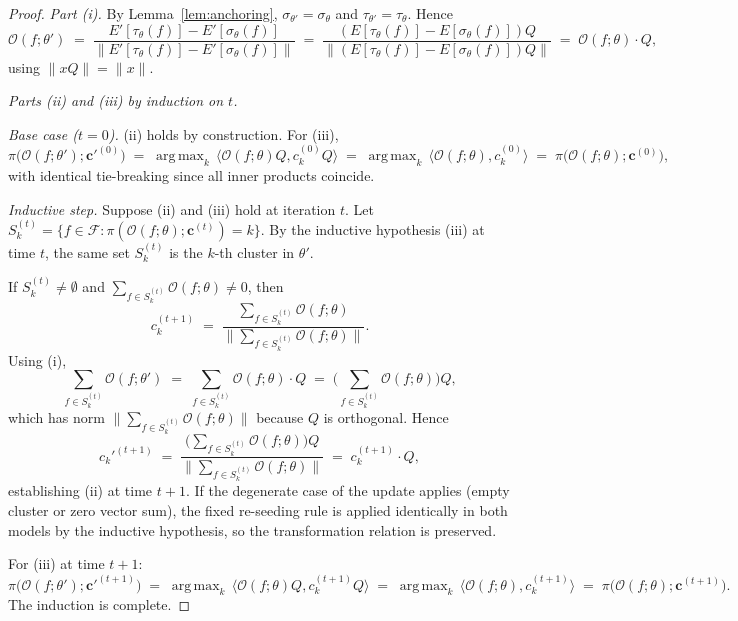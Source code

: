 \documentclass[11pt,letterpaper]{article}
\theoremstyle{definition}
\DeclareMathOperator*{\argmax}{arg\,max}
\begin{document}
\begin{proof}
\emph{Part (i).} By Lemma~\ref{lem:anchoring}, $\sigma_{\theta'} = \sigma_\theta$ and $\tau_{\theta'} = \tau_\theta$. Hence
\[
\mathcal{O}(f; \theta')
\;=\; \frac{E'[\tau_{\theta}(f)] - E'[\sigma_{\theta}(f)]}{\| E'[\tau_{\theta}(f)] - E'[\sigma_{\theta}(f)] \|}
\;=\; \frac{(E[\tau_{\theta}(f)] - E[\sigma_{\theta}(f)]) Q}{\| (E[\tau_{\theta}(f)] - E[\sigma_{\theta}(f)]) Q \|}
\;=\; \mathcal{O}(f; \theta) \cdot Q,
\]
using $\|xQ\| = \|x\|$.

\emph{Parts (ii) and (iii) by induction on $t$.}

\emph{Base case ($t=0$).} (ii) holds by construction. For (iii),
\[
\pi\big(\mathcal{O}(f; \theta'); \mathbf{c}'^{(0)}\big)
\;=\; \argmax_k \, \big\langle \mathcal{O}(f; \theta) Q, c_k^{(0)} Q \big\rangle
\;=\; \argmax_k \, \big\langle \mathcal{O}(f; \theta), c_k^{(0)} \big\rangle
\;=\; \pi\big(\mathcal{O}(f; \theta); \mathbf{c}^{(0)}\big),
\]
with identical tie-breaking since all inner products coincide.

\emph{Inductive step.} Suppose (ii) and (iii) hold at iteration $t$. Let $S_k^{(t)} = \{ f \in \mathcal{F} : \pi(\mathcal{O}(f; \theta); \mathbf{c}^{(t)}) = k \}$. By the inductive hypothesis (iii) at time $t$, the same set $S_k^{(t)}$ is the $k$-th cluster in $\theta'$.

If $S_k^{(t)} \neq \emptyset$ and $\sum_{f \in S_k^{(t)}} \mathcal{O}(f; \theta) \neq 0$, then
\[
c_k^{(t+1)} \;=\; \frac{\sum_{f \in S_k^{(t)}} \mathcal{O}(f; \theta)}{\big\| \sum_{f \in S_k^{(t)}} \mathcal{O}(f; \theta) \big\|}.
\]
Using (i),
\[
\sum_{f \in S_k^{(t)}} \mathcal{O}(f; \theta') \;=\; \sum_{f \in S_k^{(t)}} \mathcal{O}(f; \theta) \cdot Q \;=\; \Big( \sum_{f \in S_k^{(t)}} \mathcal{O}(f; \theta) \Big) Q,
\]
which has norm $\big\| \sum_{f \in S_k^{(t)}} \mathcal{O}(f; \theta) \big\|$ because $Q$ is orthogonal. Hence
\[
c_k'^{(t+1)} \;=\; \frac{\big( \sum_{f \in S_k^{(t)}} \mathcal{O}(f; \theta) \big) Q}{\| \sum_{f \in S_k^{(t)}} \mathcal{O}(f; \theta) \|} \;=\; c_k^{(t+1)} \cdot Q,
\]
establishing (ii) at time $t+1$. If the degenerate case of the update applies (empty cluster or zero vector sum), the fixed re-seeding rule is applied identically in both models by the inductive hypothesis, so the transformation relation is preserved.

For (iii) at time $t+1$:
\[
\pi\big(\mathcal{O}(f; \theta'); \mathbf{c}'^{(t+1)}\big)
\;=\; \argmax_k \, \big\langle \mathcal{O}(f; \theta) Q, c_k^{(t+1)} Q \big\rangle
\;=\; \argmax_k \, \big\langle \mathcal{O}(f; \theta), c_k^{(t+1)} \big\rangle
\;=\; \pi\big(\mathcal{O}(f; \theta); \mathbf{c}^{(t+1)}\big).
\]
The induction is complete.
\end{proof}
\end{document}
